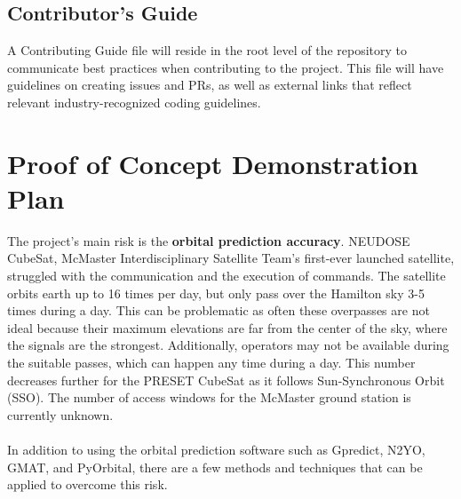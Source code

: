 \documentclass{article}
\begin{document}
\subsection{Contributor's Guide}
A Contributing Guide file will reside in the root level of the repository to communicate best practices when contributing to the project. This file will have guidelines on creating issues and PRs, as well as external links that reflect relevant industry-recognized coding guidelines.


\section{Proof of Concept Demonstration Plan}

The project's main risk is the \textbf{orbital prediction accuracy}. NEUDOSE CubeSat, McMaster Interdisciplinary Satellite Team's first-ever launched satellite, struggled with the communication and the execution of commands. The satellite orbits earth up to 16 times per day, but only pass over the Hamilton sky 3-5 times during a day. This can be problematic as often these overpasses are not ideal because their maximum elevations are far from the center of the sky, where the signals are the strongest. Additionally, operators may not be available during the suitable passes, which can happen any time during a day. This number decreases further for the PRESET CubeSat as it follows Sun-Synchronous Orbit (SSO). The number of access windows for the McMaster ground station is currently unknown.
\\\\
In addition to using the orbital prediction software such as Gpredict, N2YO, GMAT, and PyOrbital, there are a few methods and techniques that can be applied to overcome this risk.
\end{document}

